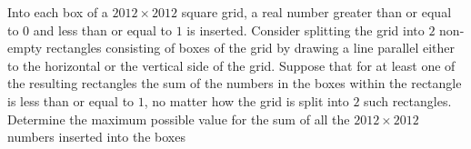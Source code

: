 \documentclass[nt_billal_v1.tex]{subfile}
\begin{document}
\begin{solution}
	
\end{solution}

\begin{problem}
	Into each box of a $2012\times 2012$ square grid, a real number greater than or equal to $0$ and less than or equal to $1$ is inserted. Consider splitting the grid into $2$ non-empty rectangles consisting of boxes of the grid by drawing a line parallel either to the horizontal or the vertical side of the grid. Suppose that for at least one of the resulting rectangles the sum of the numbers in the boxes within the rectangle is less than or equal to $1$, no matter how the grid is split into $2$ such rectangles. Determine the maximum possible value for the sum of all the $2012\times2012$ numbers inserted into the boxes
\end{problem}

\begin{solution}
	
\end{solution}
\end{document}
